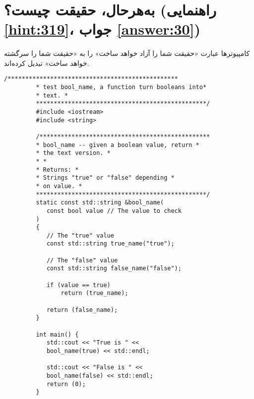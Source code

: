 \section[به‌هرحال، حقیقت چیست؟]{به‌هرحال، حقیقت چیست؟ \protect{} (راهنمایی \ref{hint:319}، جواب \ref{answer:30})}
\paragraph{}\label{prog:50}
کامپیوترها عبارت «حقیقت شما را آزاد خواهد ساخت» را به «حقیقت شما را سرگشته خواهد ساخت» تبدیل کرده‌اند.

\begin{LTR}
    \begin{lstlisting}[style=C++Style]
         /************************************************
         * test bool_name, a function turn booleans into*
         * text. *
         ************************************************/
         #include <iostream>
         #include <string>

         /************************************************
         * bool_name -- given a boolean value, return *
         * the text version. *
         * *
         * Returns: *
         * Strings "true" or "false" depending *
         * on value. *
         ************************************************/
         static const std::string &bool_name(
         	const bool value // The value to check
         )
         {
         	// The "true" value
         	const std::string true_name("true");

         	// The "false" value
         	const std::string false_name("false");

         	if (value == true)
         		return (true_name);

         	return (false_name);
         }

         int main() {
         	std::cout << "True is " <<
         	bool_name(true) << std::endl;

         	std::cout << "False is " <<
         	bool_name(false) << std::endl;
         	return (0);
         }
    \end{lstlisting}
\end{LTR}